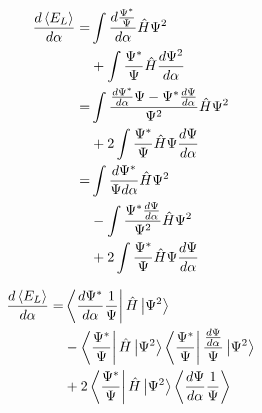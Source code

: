\begin{equation*}
    \begin{split}
        \frac{d\expval{E_L}}{d\alpha} =& \int \frac{d\frac{\Psi^*}{\Psi}}{d\alpha}\hat{H}\Psi^2 \\
        &+\int \frac{\Psi^*}{\Psi}\hat{H}\frac{d\Psi^2}{d\alpha} \\
        =& \int \frac{\frac{d\Psi^*}{d\alpha}\Psi - \Psi^*\frac{d\Psi}{d\alpha}}{\Psi^2}\hat{H}\Psi^2  \\
        &+ 2\int \frac{\Psi^*}{\Psi}\hat{H}\Psi\frac{d\Psi}{d\alpha} \\
        =& \int \frac{d\Psi^*}{\Psi d\alpha}\hat{H}\Psi^2 \\
        &- \int \frac{\Psi^*\frac{d\Psi}{d\alpha}}{\Psi^2}\hat{H}\Psi^2 \\
        &+ 2\int \frac{\Psi^*}{\Psi}\hat{H}\Psi\frac{d\Psi}{d\alpha} \\
    \end{split}
\end{equation*}

\begin{equation*}
    \begin{split}
        \frac{d\expval{E_L}}{d\alpha} =& \bra{\frac{d\Psi^*}{d\alpha}\frac{1}{\Psi}}\hat{H}\ket{\Psi^2} \\
        &- \bra{\frac{\Psi^*}{\Psi}}\hat{H}\ket{\Psi^2}\bra{\frac{\Psi^*}{\Psi}}\frac{\frac{d\Psi}{d\alpha}}{\Psi}\ket{\Psi^2} \\
        &+ 2\bra{\frac{\Psi^*}{\Psi}}\hat{H}\ket{\Psi^2}\expval{\frac{d\Psi}{d\alpha}\frac{1}{\Psi}}
    \end{split}
\end{equation*}